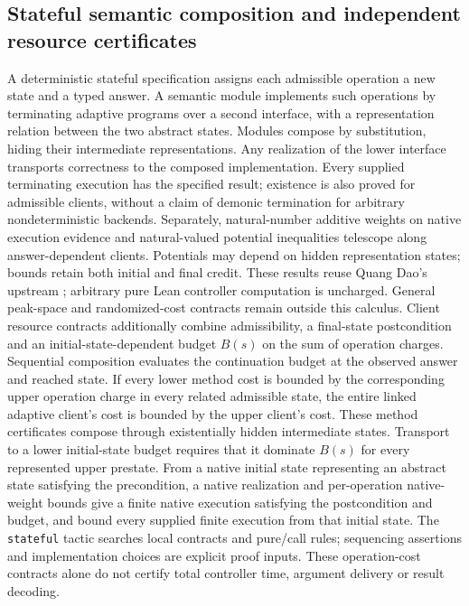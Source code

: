 \begin{result}
\subsection{Stateful semantic composition and independent resource certificates}
A deterministic stateful specification assigns each admissible operation a new state and a typed
answer. A semantic module implements such operations by terminating adaptive programs over a
second interface, with a representation relation between the two abstract states. Modules
compose by substitution, hiding their intermediate representations. Any realization of the lower
interface transports correctness to the composed implementation. Every supplied terminating
execution has the specified result; existence is also proved for admissible clients, without a
claim of demonic termination for arbitrary nondeterministic backends.
Separately, natural-number additive weights on native execution evidence and natural-valued
potential inequalities
telescope along answer-dependent clients. Potentials may depend on hidden representation states;
bounds retain both initial and final credit. These results reuse Quang Dao's upstream
; arbitrary pure Lean controller computation is uncharged. General
peak-space and randomized-cost contracts remain outside this calculus.
Client resource contracts additionally combine admissibility, a final-state postcondition and
an initial-state-dependent budget $B(s)$ on the sum of operation charges. Sequential composition
evaluates the continuation budget at the observed answer and reached state. If every lower method
cost is bounded by the corresponding upper operation charge in every related admissible state,
the entire linked adaptive client's cost is bounded by the upper client's cost. These method
certificates compose through existentially hidden intermediate states. Transport to a lower
initial-state budget requires that it dominate $B(s)$ for every represented upper prestate.
From a native initial state representing an abstract state satisfying the precondition,
a native realization and per-operation native-weight bounds give a finite native execution
satisfying the postcondition and budget, and bound every supplied finite execution from that
initial state. The \texttt{stateful} tactic searches local contracts and pure/call rules;
sequencing assertions and implementation choices are explicit proof inputs. These operation-cost
contracts alone do not certify total controller time, argument delivery or result decoding.
\citep[Chapter 17]{CLRS2009}

\end{result}
